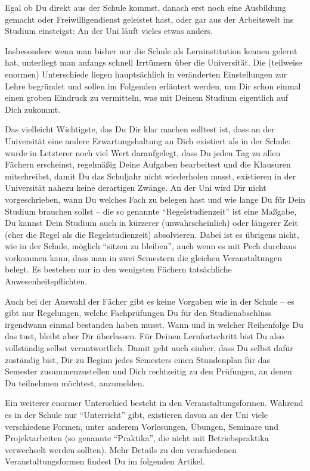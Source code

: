 {Egal ob Du direkt aus der Schule kommst, danach erst noch eine Ausbildung gemacht oder Freiwilligendienst geleistet hast, oder gar aus der Arbeitswelt ins Studium einsteigst: An der Uni läuft vieles etwas anders.}
{Insbesondere wenn man bisher nur die Schule als Lerninstitution kennen gelernt hat, unterliegt man anfangs schnell Irrtümern über die Universität. Die (teilweise enormen) Unterschiede liegen hauptsächlich in veränderten Einstellungen zur Lehre begründet und sollen im Folgenden erläutert werden, um Dir schon einmal einen groben Eindruck zu vermitteln, was mit Deinem Studium eigentlich auf Dich zukommt.

Das vielleicht Wichtigste, das Du Dir klar machen solltest ist, dass an der Universität eine andere Erwartungshaltung an Dich existiert als in der Schule: wurde in Letzterer noch viel Wert daraufgelegt, dass Du jeden Tag zu allen Fächern erscheinst, regelmäßig Deine Aufgaben bearbeitest und die Klausuren mitschreibst, damit Du das Schuljahr nicht wiederholen musst, existieren in der Universität nahezu keine derartigen Zwänge. An der Uni wird Dir nicht vorgeschrieben, wann Du welches Fach zu belegen hast und wie lange Du für Dein Studium brauchen sollst – die so genannte "`Regelstudienzeit"' ist eine Maßgabe, Du kannst Dein Studium auch in kürzerer (unwahrscheinlich) oder längerer Zeit (eher die Regel als die Regelstudienzeit) absolvieren. Dabei ist es übrigens nicht, wie in der Schule, möglich "`sitzen zu bleiben"', auch wenn es mit Pech durchaus vorkommen kann, dass man in zwei Semestern die gleichen Veranstaltungen belegt. Es bestehen nur in den wenigsten Fächern tatsächliche Anwesenheitspflichten.

Auch bei der Auswahl der Fächer gibt es keine Vorgaben wie in der Schule – es gibt nur Regelungen, welche Fachprüfungen Du für den Studienabschluss irgendwann einmal bestanden haben musst. Wann und in welcher Reihenfolge Du das tust, bleibt aber Dir überlassen. Für Deinen Lernfortschritt bist Du also vollständig selbst verantwortlich. Damit geht auch einher, dass Du selbst dafür zuständig bist, Dir zu Beginn jedes Semesters einen Stundenplan für das Semester zusammenzustellen und Dich rechtzeitig zu den Prüfungen, an denen Du teilnehmen möchtest, anzumelden.

Ein weiterer enormer Unterschied besteht in den Veranstaltungsformen. Während es in der Schule nur "`Unterricht"' gibt, existieren davon an der Uni viele verschiedene Formen, unter anderem Vorlesungen, Übungen, Seminare und Projektarbeiten (so genannte "`Praktika"', die nicht mit Betriebspraktika verwechselt werden sollten). Mehr Details zu den verschiedenen Veranstaltungsformen findest Du im folgenden Artikel.

}
